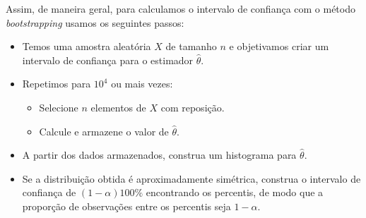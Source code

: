 \documentclass{article}
\begin{document}
Assim, de maneira geral, para calculamos o intervalo de confiança com o método \textit{bootstrapping} usamos os seguintes passos:
\begin{itemize}
    \item Temos uma amostra aleatória $X$ de tamanho $n$ e objetivamos criar um intervalo de confiança para o estimador $\hat{\theta}$.
    \item Repetimos para $10^4$ ou mais vezes:
    \begin{itemize}
        \item Selecione $n$ elementos de $X$ com reposição.
        \item Calcule e armazene o valor de $\hat{\theta}$.
    \end{itemize}
    \item A partir dos dados armazenados, construa um histograma para $\hat{\theta}$.
    \item Se a distribuição obtida é aproximadamente simétrica, construa o intervalo de confiança de $(1-\alpha)100\%$ encontrando os percentis, de modo que a proporção de observações entre os percentis seja $1-\alpha$.
\end{itemize}
\end{document}
